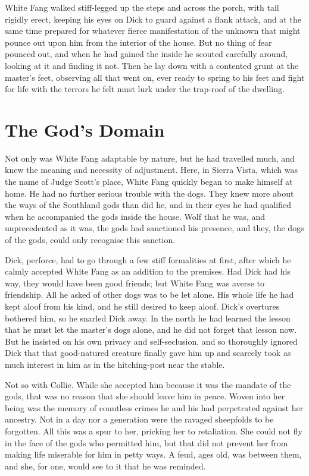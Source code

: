 \documentclass[10pt]{book}
\begin{document}
White Fang walked stiff-legged up the steps and across the porch, with
tail rigidly erect, keeping his eyes on Dick to guard against a flank
attack, and at the same time prepared for whatever fierce manifestation
of the unknown that might pounce out upon him from the interior of the
house. But no thing of fear pounced out, and when he had gained the
inside he scouted carefully around, looking at it and finding it not.
Then he lay down with a contented grunt at the master’s feet, observing
all that went on, ever ready to spring to his feet and fight for life
with the terrors he felt must lurk under the trap-roof of the dwelling.

\chapter{The God's Domain}

Not only was White Fang adaptable by nature, but he had travelled much,
and knew the meaning and necessity of adjustment. Here, in Sierra
Vista, which was the name of Judge Scott’s place, White Fang quickly
began to make himself at home. He had no further serious trouble with
the dogs. They knew more about the ways of the Southland gods than did
he, and in their eyes he had qualified when he accompanied the gods
inside the house. Wolf that he was, and unprecedented as it was, the
gods had sanctioned his presence, and they, the dogs of the gods, could
only recognise this sanction.

Dick, perforce, had to go through a few stiff formalities at first,
after which he calmly accepted White Fang as an addition to the
premises. Had Dick had his way, they would have been good friends;
but White Fang was averse to friendship. All he asked of other dogs was
to be let alone. His whole life he had kept aloof from his kind, and he
still desired to keep aloof. Dick’s overtures bothered him, so he
snarled Dick away. In the north he had learned the lesson that he must
let the master’s dogs alone, and he did not forget that lesson now. But
he insisted on his own privacy and self-seclusion, and so thoroughly
ignored Dick that that good-natured creature finally gave him up and
scarcely took as much interest in him as in the hitching-post near the
stable.

Not so with Collie. While she accepted him because it was the mandate
of the gods, that was no reason that she should leave him in peace.
Woven into her being was the memory of countless crimes he and his had
perpetrated against her ancestry. Not in a day nor a generation were
the ravaged sheepfolds to be forgotten. All this was a spur to her,
pricking her to retaliation. She could not fly in the face of the gods
who permitted him, but that did not prevent her from making life
miserable for him in petty ways. A feud, ages old, was between them,
and she, for one, would see to it that he was reminded.
\end{document}
